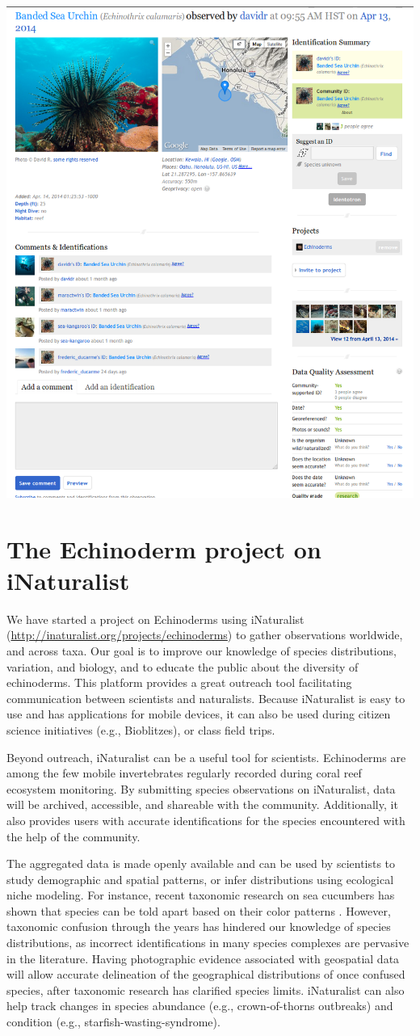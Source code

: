 \documentclass[11pt]{article}\usepackage[]{graphicx}\usepackage[]{color}
\begin{document}
\begin{center}
\includegraphics[width=.5\columnwidth]{images/inat-screenshot.png}
\label{fig:example-observation}
\end{center}

\section*{The Echinoderm project on iNaturalist}

We have started a project on Echinoderms using iNaturalist
(\href{http://inaturalist.org/projects/echinoderms}{http://inaturalist.org/projects/echinoderms})
to gather observations worldwide, and across taxa. Our goal is to improve our
knowledge of species distributions, variation, and biology, and to educate the
public about the diversity of echinoderms. This platform provides a great
outreach tool facilitating communication between scientists and
naturalists. Because iNaturalist is easy to use and has applications for mobile
devices, it can also be used during citizen science initiatives (e.g.,
Bioblitzes), or class field trips.

Beyond outreach, iNaturalist can be a useful tool for scientists. Echinoderms
are among the few mobile invertebrates regularly recorded during coral reef
ecosystem monitoring. By submitting species observations on iNaturalist, data
will be archived, accessible, and shareable with the community. Additionally, it
also provides users with accurate identifications for the species encountered
with the help of the community.

The aggregated data is made openly available and can be used by scientists to
study demographic and spatial patterns, or infer distributions using ecological
niche modeling. For instance, recent taxonomic research on sea cucumbers has
shown that species can be told apart based on their color patterns
\citep[e.g.][]{Kim2013,Kerr2013}. However, taxonomic confusion through the
years has hindered our knowledge of species distributions, as incorrect
identifications in many species complexes are pervasive in the
literature. Having photographic evidence associated with geospatial data will
allow accurate delineation of the geographical distributions of once confused
species, after taxonomic research has clarified species limits. iNaturalist can
also help track changes in species abundance (e.g., crown-of-thorns outbreaks)
and condition (e.g., starfish-wasting-syndrome).
\end{document}
